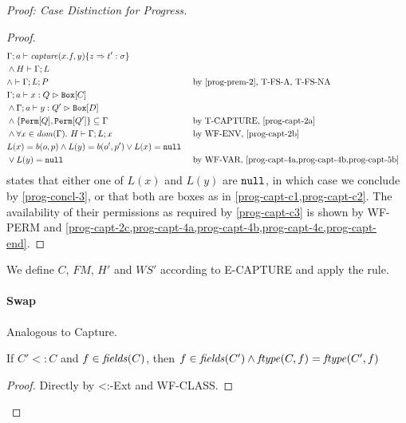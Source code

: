 \begin{proof}[Proof: Case Distinction for Progress]
\begin{proof}
\begin{alignat}{3}
& \Gamma ; a \vdash \vn{capture}(x.f, y) \{ z \Rightarrow t' : \sigma \} \label{prog-capt-2a}\\
& \wedge H \vdash \Gamma; L \label{prog-capt-2b}\\
& \wedge \vdash \Gamma; L; P \label{prog-capt-2c} && \text{ by \cref{prog-prem-2}, T-FS-A, T-FS-NA}\\
& \Gamma; a \vdash x : Q \vartriangleright \mn{Box}[C] \label{prog-capt-4a}\\
& \wedge \Gamma; a \vdash y : Q' \vartriangleright \mn{Box}[D] \label{prog-capt-4b}\\
& \wedge \{\mn{Perm}[Q], \mn{Perm}[Q']\} \subseteq \Gamma \label{prog-capt-4c}
&& \text{ by T-CAPTURE, \cref{prog-capt-2a}}\\
& \wedge \forall x \in \vn{dom}(\Gamma).\ H \vdash \Gamma; L; x \label{prog-capt-5b} && \text{ by WF-ENV, \cref{prog-capt-2b}}\\
\nonumber& L(x) = b(o,p) \wedge L(y) = b(o', p') \vee L(x) = \mn{null}\\
& \vee L(y) = \mn{null} \label{prog-capt-end}&& \text{ by WF-VAR, \cref{prog-capt-4a,prog-capt-4b,prog-capt-5b}}
\end{alignat}
 states that either one of $L(x)$ and $L(y)$ are $\texttt{null}$, in which case we conclude by \cref{prog-concl-3}, or that both are boxes as in \cref{prog-capt-c1,prog-capt-c2}. The availability of their permissions as required by \cref{prog-capt-c3} is shown by WF-PERM and \cref{prog-capt-2c,prog-capt-4a,prog-capt-4b,prog-capt-4c,prog-capt-end}.
\end{proof}

We define $C$, $FM$, $H'$ and $WS'$ according to E-CAPTURE and apply the rule.

\paragraph{Swap}
Analogous to Capture.

\begin{lemma}\label{prog-select-lemma-4}
    If $C' <: C$ and $f \in \mathop{\mathit{fields}}(C)$, then $f \in \mathop{\mathit{fields}}(C') \wedge \mathop{\mathit{ftype}}(C, f) = \mathop{\mathit{ftype}}(C', f)$
\end{lemma}
\begin{proof}
    Directly by <:-Ext and WF-CLASS.
\end{proof}


\end{proof}
